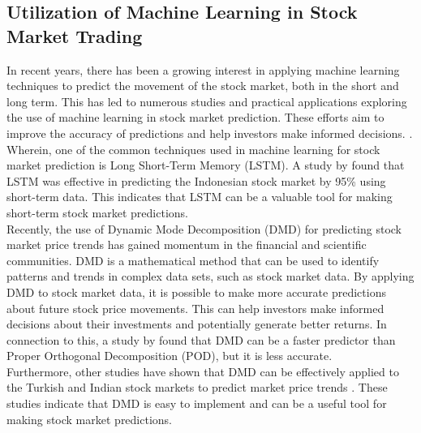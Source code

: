 \subsection{Utilization of Machine Learning in Stock Market Trading}
In recent years, there has been a growing interest in applying machine 
learning techniques to predict the movement of the stock market, 
both in the short and long term. This has led to numerous studies and 
practical applications exploring the use of machine learning in stock market prediction.
 These efforts aim to improve the accuracy of predictions and help investors make 
 informed decisions.
\cite{Kumbure2022, Strader2020, Soni2022, Rea2020, Guo2022}.
 Wherein, one of the common techniques used in machine learning for 
 stock market prediction is Long Short-Term Memory (LSTM). 
 A study by  found that LSTM was effective in predicting the 
 Indonesian stock market by 95\% using short-term data. 
 This indicates that LSTM can be a valuable tool for making short-term stock 
 market predictions.
\\Recently, the use of Dynamic Mode Decomposition (DMD) 
for predicting stock market price trends has gained momentum in the financial 
and scientific communities. DMD is a mathematical method that can be used 
to identify patterns and trends in complex data sets, such as stock market data.
By applying DMD to stock market data, it is possible to make more accurate 
predictions about future stock price movements. This can help investors make
informed decisions about their investments and potentially generate better returns.
In connection to this, a study by  found that DMD can be a 
faster predictor than Proper Orthogonal Decomposition (POD), but 
it is less accurate.
\\Furthermore, other studies have shown that DMD can be effectively 
applied to the Turkish and Indian stock markets to predict market price trends
\cite{Savas2017, Kuttichira2017}.
These studies indicate that DMD is easy to implement and can be a useful 
tool for making stock market predictions.